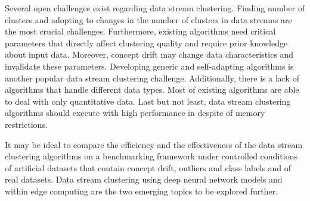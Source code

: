 \documentclass[smallcondensed]{svjour3}     %
\begin{document}
Several open challenges exist regarding data stream clustering. Finding number of clusters and adopting to changes in the number of clusters in data streams are the most crucial challenges. Furthermore, existing algorithms need critical parameters that directly affect clustering quality and require prior knowledge about input data. Moreover, concept drift may change data characteristics and invalidate these parameters. Developing generic and self-adapting algorithms is another popular data stream clustering challenge. Additionally, there is a lack of algorithms that handle different data types. Most of existing algorithms are able to deal with only quantitative data. Last but not least, data stream clustering algorithms should execute with high performance in despite of memory restrictions. 

It may be ideal to compare the efficiency and the effectiveness of the data stream clustering algorithms on a benchmarking framework under controlled conditions of artificial datasets that contain concept drift, outliers and class labels and of real datasets. Data stream clustering using deep neural network models and within edge computing are the two emerging topics to be explored further.





\end{document}
